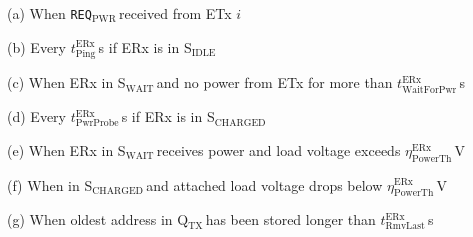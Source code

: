\documentclass[11pt,draftclsnofoot,journal,onecolumn]{IEEEtran}
\newcommand{\textsubscript}[1]{$_{\text{#1}}$}
\newcommand{\rxStateIdle}{\textsf{S\textsubscript{IDLE}}\,}
\newcommand{\rxStateWaiting}{\textsf{S\textsubscript{WAIT}}\,}
\newcommand{\rxStateCharged}{\textsf{S\textsubscript{CHARGED}}\,}
\newcommand{\rxDelayPing}{$t^\text{ERx}_\text{Ping}$}
\newcommand{\rxDelayRemoveLastProbeSender}{$t^\text{ERx}_\text{RmvLast}$}
\newcommand{\rxDelayWaitingForPower}{$t^\text{ERx}_\text{WaitForPwr}$}
\newcommand{\rxDelayPowerProbing}{$t^\text{ERx}_\text{PwrProbe}$}
\newcommand{\rxVoltageThreshold}{$\eta^\text{ERx}_\text{PowerTh}$}
\newcommand{\powerProbeRequest}{\texttt{REQ\textsubscript{PWR}}\,}
\newcommand{\txAddressQueue}{Q\textsubscript{TX}\,}
\begin{document}
\begin{algorithm}[t]
\begin{threeparttable}[b]
\begin{tablenotes}
	\item[(a)] When \powerProbeRequest received from ETx $i$
	\item[(b)] Every \rxDelayPing\,s if ERx is in \rxStateIdle
	\item[(c)] When ERx in \rxStateWaiting and no power from ETx for more than \rxDelayWaitingForPower\,s
	\item[(d)] Every \rxDelayPowerProbing\,s if ERx is in \rxStateCharged
	\item[(e)] When ERx in \rxStateWaiting receives power and load voltage exceeds \rxVoltageThreshold\,V
	\item[(f)] When in \rxStateCharged and attached load voltage drops below \rxVoltageThreshold\,V
	\item[(g)] When oldest address in \txAddressQueue has been stored longer than \rxDelayRemoveLastProbeSender\,s
\end{tablenotes}
\end{threeparttable}

\end{algorithm}
\end{document}
